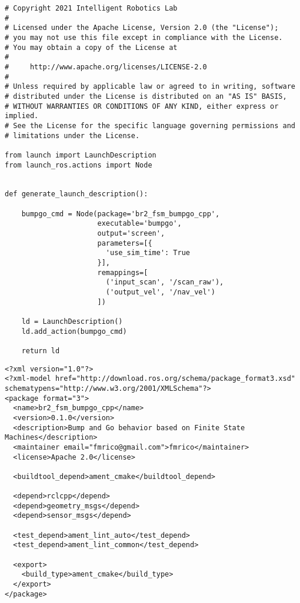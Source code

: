  \footnotesize
\begin{tcolorbox}[sharp corners, colframe=gray!80, colback=LightGray, left=0pt, top=0pt, bottom=0pt, title=\texttt{br2\_fsm\_bumpgo\_cpp/launch/bump\_and\_go.launch.py}]
  \begin{verbatim}
# Copyright 2021 Intelligent Robotics Lab
#
# Licensed under the Apache License, Version 2.0 (the "License");
# you may not use this file except in compliance with the License.
# You may obtain a copy of the License at
#
#     http://www.apache.org/licenses/LICENSE-2.0
#
# Unless required by applicable law or agreed to in writing, software
# distributed under the License is distributed on an "AS IS" BASIS,
# WITHOUT WARRANTIES OR CONDITIONS OF ANY KIND, either express or implied.
# See the License for the specific language governing permissions and
# limitations under the License.

from launch import LaunchDescription
from launch_ros.actions import Node


def generate_launch_description():

    bumpgo_cmd = Node(package='br2_fsm_bumpgo_cpp',
                      executable='bumpgo',
                      output='screen',
                      parameters=[{
                        'use_sim_time': True
                      }],
                      remappings=[
                        ('input_scan', '/scan_raw'),
                        ('output_vel', '/nav_vel')
                      ])

    ld = LaunchDescription()
    ld.add_action(bumpgo_cmd)

    return ld
    \end{verbatim}
    \end{tcolorbox}
  \normalsize

 \footnotesize
\begin{tcolorbox}[sharp corners, colframe=gray!80, colback=LightGray, left=0pt, top=0pt, bottom=0pt, title=\texttt{br2\_fsm\_bumpgo\_cpp/package.xml}]
  \begin{verbatim}
<?xml version="1.0"?>
<?xml-model href="http://download.ros.org/schema/package_format3.xsd" schematypens="http://www.w3.org/2001/XMLSchema"?>
<package format="3">
  <name>br2_fsm_bumpgo_cpp</name>
  <version>0.1.0</version>
  <description>Bump and Go behavior based on Finite State Machines</description>
  <maintainer email="fmrico@gmail.com">fmrico</maintainer>
  <license>Apache 2.0</license>

  <buildtool_depend>ament_cmake</buildtool_depend>

  <depend>rclcpp</depend>
  <depend>geometry_msgs</depend>
  <depend>sensor_msgs</depend>

  <test_depend>ament_lint_auto</test_depend>
  <test_depend>ament_lint_common</test_depend>

  <export>
    <build_type>ament_cmake</build_type>
  </export>
</package>
    \end{verbatim}
    \end{tcolorbox}
  \normalsize

